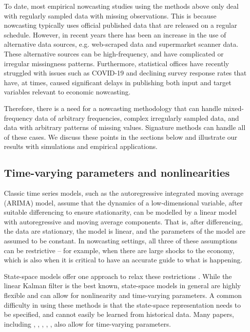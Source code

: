 \documentclass[a4paper, 12pt]{article}
\theoremstyle{remark}
\begin{document}
To date, most empirical nowcasting studies using the methods above only deal with regularly sampled data with missing observations. This is because nowcasting typically uses official published data that are released on a regular schedule. However, in recent years there has been an increase in the use of alternative data sources, e.g. web-scraped data and supermarket scanner data. These alternative sources can be high-frequency, and have complicated or irregular missingness patterns. Furthermore, statistical offices have recently struggled with issues such as COVID-19 and declining survey response rates that have, at times, caused significant delays in publishing both input and target variables relevant to economic nowcasting. 

Therefore, there is a need for a nowcasting methodology that can handle mixed-frequency data of arbitrary frequencies, complex irregularly sampled data, and data with arbitrary patterns of missing values. Signature methods can handle all of these cases. We discuss these points in the sections below and illustrate our results with simulations and empirical applications.

\subsection{Time-varying parameters and nonlinearities} \label{subsec:nonlinear}

Classic time series models, such as the autoregressive integrated moving average (ARIMA) model, assume that the dynamics of a low-dimensional variable, after suitable differencing to ensure stationarity, can be modelled by a linear model with autoregressive and moving average components. That is, after differencing, the data are stationary, the model is linear, and the parameters of the model are assumed to be constant. In nowcasting settings, all three of these assumptions can be restrictive -- for example, when there are large shocks to the economy, which is also when it is critical to have an accurate guide to what is happening.

State-space models offer one approach to relax these restrictions \citep{durbin2012time}. While the linear Kalman filter is the best known, state-space models in general are highly flexible and can allow for nonlinearity and time-varying parameters. 
A common difficulty in using these methods is that the state-space representation needs to be specified, and cannot easily be learned from historical data.
Many papers, including \cite{hamilton1994state}, \cite{nielsen2014estimation}, \cite{carter1994gibbs}, \cite{kim1999state}, \cite{kim1994dynamic}, also allow for time-varying parameters.
\end{document}

